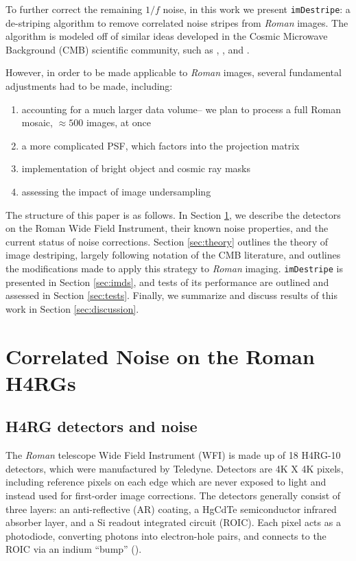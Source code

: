 \documentclass[12pt]{pasj01}
\begin{document}
To further correct the remaining $1/f$ noise, in this work we present \texttt{imDestripe}: a de-striping algorithm to remove correlated noise stripes from \textit{Roman} images. The algorithm is modeled off of similar ideas developed in the Cosmic Microwave Background (CMB) scientific community, such as \cite{Keihanen2004}, \cite{Delabrouille1998}, and \cite{Sutton2009}. 

However, in order to be made applicable to \textit{Roman} images, several fundamental adjustments had to be made, including:

\begin{enumerate}
    \item accounting for a much larger data volume-- we plan to process a full Roman mosaic, $\approx500$ images, at once
    \item a more complicated PSF, which factors into the projection matrix 
    \item implementation of bright object and cosmic ray masks
    \item assessing the impact of image undersampling
\end{enumerate}

The structure of this paper is as follows. In Section \ref{sec:detectors}, we describe the detectors on the Roman Wide Field Instrument, their known noise properties, and the current status of noise corrections. Section \ref{sec:theory} outlines the theory of image destriping, largely following notation of the CMB literature, and outlines the modifications made to apply this strategy to \textit{Roman} imaging. \texttt{imDestripe} is presented in Section \ref{sec:imds}, and tests of its performance are outlined and assessed in Section \ref{sec:tests}. Finally, we summarize and discuss results of this work in Section \ref{sec:discussion}.

\section{Correlated Noise on the Roman H4RGs}\label{sec:detectors}

\subsection{H4RG detectors and noise}

The \textit{Roman} telescope Wide Field Instrument (WFI) is made up of 18 H4RG-10 detectors, which were manufactured by Teledyne. Detectors are 4K X 4K pixels, including reference pixels on each edge which are never exposed to light and instead used for first-order image corrections. The detectors generally consist of three layers: an anti-reflective (AR) coating, a HgCdTe semiconductor infrared absorber layer, and a Si readout integrated circuit (ROIC). Each pixel acts as a photodiode, converting photons into electron-hole pairs, and connects to the ROIC via an indium ``bump'' (\cite{Mosby2020}).
\end{document}
